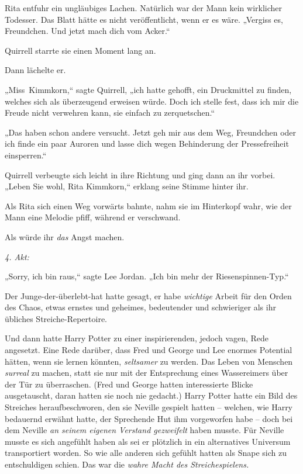 {Rita entfuhr ein ungläubiges Lachen. Natürlich war der Mann kein wirklicher Todesser. Das Blatt hätte es nicht veröffentlicht, wenn er es wäre. „Vergiss es, Freundchen. Und jetzt mach dich vom Acker.“

Quirrell starrte sie einen Moment lang an.

Dann lächelte er.

„Miss~Kimmkorn,“ sagte Quirrell, „ich hatte gehofft, ein Druckmittel zu finden, welches sich als überzeugend erweisen würde. Doch ich stelle fest, dass ich mir die Freude nicht verwehren kann, sie einfach zu zerquetschen.“

„Das haben schon andere versucht. Jetzt geh mir aus dem Weg, Freundchen oder ich finde ein paar Auroren und lasse dich wegen Behinderung der Pressefreiheit einsperren.“

Quirrell verbeugte sich leicht in ihre Richtung und ging dann an ihr vorbei. „Leben Sie wohl, Rita Kimmkorn,“ erklang seine Stimme hinter ihr.

Als Rita sich einen Weg vorwärts bahnte, nahm sie im Hinterkopf wahr, wie der Mann eine Melodie pfiff, während er verschwand.

Als würde ihr \emph{das} Angst machen.

\later

\emph{4. Akt:}

„Sorry, ich bin raus,“ sagte Lee Jordan. „Ich bin mehr der Riesenspinnen-Typ.“

Der Junge-der-überlebt-hat hatte gesagt, er habe \emph{wichtige} Arbeit für den Orden des Chaos, etwas ernstes und geheimes, bedeutender und schwieriger als ihr übliches Streiche-Repertoire.

Und dann hatte Harry Potter zu einer inspirierenden, jedoch vagen, Rede angesetzt. Eine Rede darüber, dass Fred und George und Lee enormes Potential hätten, wenn sie lernen könnten, \emph{seltsamer} zu werden. Das Leben von Menschen \emph{surreal} zu machen, statt sie nur mit der Entsprechung eines Wassereimers über der Tür zu überraschen. (Fred und George hatten interessierte Blicke ausgetauscht, daran hatten sie noch nie gedacht.) Harry Potter hatte ein Bild des Streiches heraufbeschworen, den sie Neville gespielt hatten -- welchen, wie Harry bedauernd erwähnt hatte, der Sprechende Hut ihm vorgeworfen habe -- doch bei dem Neville \emph{an seinem eigenen Verstand gezweifelt} haben musste. Für Neville musste es sich angefühlt haben als sei er plötzlich in ein alternatives Universum transportiert worden. So wie alle anderen sich gefühlt hatten als Snape sich zu entschuldigen schien. Das war die \emph{wahre Macht des Streichespielens.}

}
